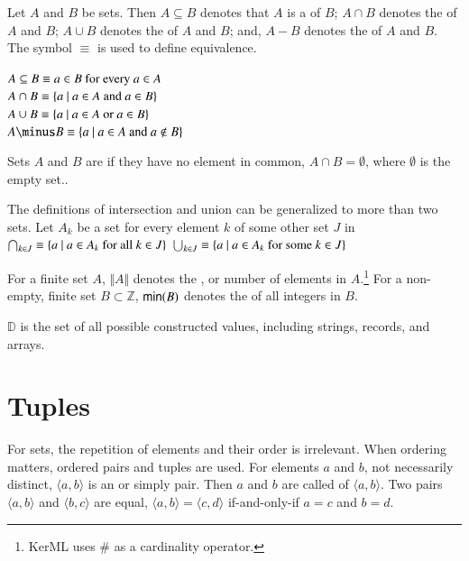 \pn Let $A$ and $B$ be sets.  Then $A\subseteq B$ denotes that $A$ is a  of $B$; $A\cap B$ denotes the  of $A$ and $B$; 
$A\cup B$ denotes the  of $A$ and $B$; and, $A \minus B$ denotes the  of $A$ and $B$.  The symbol $\equiv$ is used to define equivalence.

\(A \subseteq B \equiv a \in B~$for every$~a \in A\) \\
\(A\cap B \equiv \{a~\vert~ a\in A~$and$~a\in B\}\) \\
\(A\cup B \equiv \{a~\vert~ a\in A~$or$~a\in B\}\) \\
\(A \minus B \equiv \{a~\vert~ a\in A~$and$~a\notin B\}\) 

\pn Sets $A$ and $B$ are  if they have no element in common, $A\cap B=\emptyset$, where $\emptyset$ is the empty set..

\pn The definitions of intersection and union can be generalized to more than two sets.  Let $A_k$ be a set for every element $k$ of some other set $J$ in
\(\bigcap_{k\in J} \equiv \{a~\vert~ a\in A_k~$for all$~k\in J\}\)
\(\bigcup_{k\in J} \equiv \{a~\vert~ a\in A_k~$for some$~k\in J\}\)

\pn For a finite set $A$, $\Vert A\Vert$ denotes the , or number of elements in $A$.\footnote{KerML uses \# as a cardinality operator.}  For a non-empty, finite set $B\subset\mathbb{Z}$, $\operatorname*{\mathsf{min}}(B)$ denotes the  of all integers in $B$.

\pn $\mathbb{D}$ is the set of all possible constructed values, including strings, records, and arrays.%

\section{Tuples}\label{sec:informal_tuples}

\pn For sets, the repetition of elements and their order is irrelevant.  When ordering matters, ordered pairs and tuples are used.  For elements $a$ and $b$, not necessarily distinct, $\langle a,b\rangle $ is an  or simply pair.  Then $a$ and $b$ are called  of $\langle a,b\rangle$.  Two pairs $\langle a,b\rangle$ and $\langle b,c\rangle$ are equal,
$\langle a,b\rangle=\langle c,d\rangle$ if-and-only-if $a=c$ and $b=d$.

